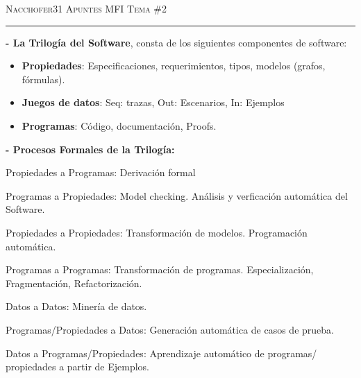 \documentclass[12pt]{amsart}
\begin{document}
    {\scshape Nacchofer31} \hfill {\scshape \large Apuntes MFI} \hfill {\scshape Tema \#2}
     
    \hrule
    \medskip
    
    \textbf{- La Trilogía del Software}, consta de los siguientes
    componentes de software:
    
    \begin{itemize}
        \item \textbf{Propiedades}: Especificaciones, requerimientos,
        tipos, modelos (grafos, fórmulas).
        \item \textbf{Juegos de datos}: Seq: trazas, Out: Escenarios,
        In: Ejemplos 
        \item \textbf{Programas}: Código, documentación, Proofs.
    \end{itemize}
    
    \textbf{- Procesos Formales de la Trilogía:}

    Propiedades a Programas: Derivación formal

    Programas a Propiedades: Model checking. Análisis y verficación automática
    del Software.

    Propiedades a Propiedades: Transformación de modelos. Programación
    automática.

    Programas a Programas: Transformación de programas. Especialización,
    Fragmentación, Refactorización.

    Datos a Datos: Minería de datos.

    Programas/Propiedades a Datos: Generación automática de casos de
    prueba.
    
    Datos a Programas/Propiedades: Aprendizaje automático de programas/
    propiedades a partir de Ejemplos.
    
    
\end{document}
